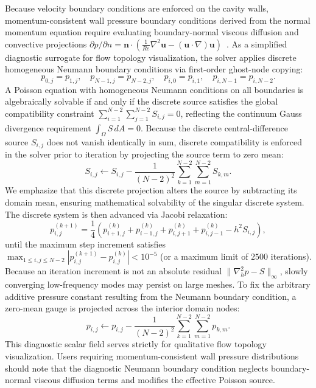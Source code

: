 \documentclass[11pt,a4paper]{article}
\begin{document}
Because velocity boundary conditions are enforced on the cavity walls, momentum-consistent wall pressure boundary conditions derived from the normal momentum equation require evaluating boundary-normal viscous diffusion and convective projections $\partial p / \partial n = \mathbf{n} \cdot (\frac{1}{Re}\nabla^2 \mathbf{u} - (\mathbf{u}\cdot\nabla)\mathbf{u})$~\cite{gresho1987solving,quartapelle1993numerical}. As a simplified diagnostic surrogate for flow topology visualization, the solver applies discrete homogeneous Neumann boundary conditions via first-order ghost-node copying:
\begin{equation}
    p_{0, j} = p_{1, j}, \quad p_{N-1, j} = p_{N-2, j}, \quad p_{i, 0} = p_{i, 1}, \quad p_{i, N-1} = p_{i, N-2}.
\end{equation}
A Poisson equation with homogeneous Neumann conditions on all boundaries is algebraically solvable if and only if the discrete source satisfies the global compatibility constraint $\sum_{i=1}^{N-2} \sum_{j=1}^{N-2} S_{i, j} = 0$, reflecting the continuum Gauss divergence requirement $\int_\Omega S \, dA = 0$. Because the discrete central-difference source $S_{i, j}$ does not vanish identically in sum, discrete compatibility is enforced in the solver prior to iteration by projecting the source term to zero mean:
\begin{equation}
    S_{i, j} \leftarrow S_{i, j} - \frac{1}{(N-2)^2} \sum_{k=1}^{N-2} \sum_{m=1}^{N-2} S_{k, m}.
\end{equation}
We emphasize that this discrete projection alters the source by subtracting its domain mean, ensuring mathematical solvability of the singular discrete system. The discrete system is then advanced via Jacobi relaxation:
\begin{equation}
    p_{i, j}^{(k+1)} = \frac{1}{4} \left( p_{i+1, j}^{(k)} + p_{i-1, j}^{(k)} + p_{i, j+1}^{(k)} + p_{i, j-1}^{(k)} - h^2 S_{i, j} \right),
\end{equation}
until the maximum step increment satisfies $\max_{1 \le i, j \le N-2} |p_{i, j}^{(k+1)} - p_{i, j}^{(k)}| < 10^{-5}$ (or a maximum limit of $2500$ iterations). Because an iteration increment is not an absolute residual $\|\nabla_h^2 p - S\|_\infty$, slowly converging low-frequency modes may persist on large meshes. To fix the arbitrary additive pressure constant resulting from the Neumann boundary condition, a zero-mean gauge is projected across the interior domain nodes:
\begin{equation}
    p_{i, j} \leftarrow p_{i, j} - \frac{1}{(N-2)^2} \sum_{k=1}^{N-2} \sum_{m=1}^{N-2} p_{k, m}.
\end{equation}
This diagnostic scalar field serves strictly for qualitative flow topology visualization. Users requiring momentum-consistent wall pressure distributions should note that the diagnostic Neumann boundary condition neglects boundary-normal viscous diffusion terms and modifies the effective Poisson source.
\end{document}
